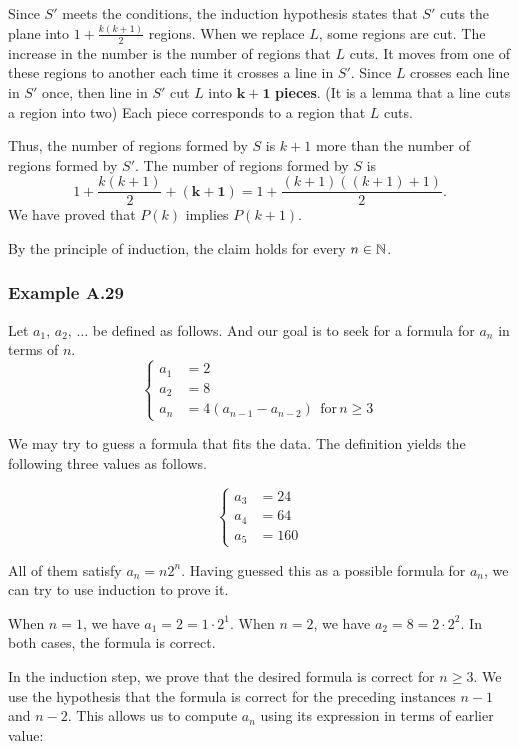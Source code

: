 \documentclass[../src/handouts/main.tex]{subfiles}
\begin{document}
Since $S'$ meets the conditions, the induction hypothesis states that $S'$ cuts the plane into $1 + \frac{k (k + 1)}{2}$ regions.
When we replace $L$, some regions are cut.
The increase in the number is the number of regions that $L$ cuts. It moves from one of these regions to another each time it crosses a line in $S'$.
Since $L$ crosses each line in $S'$ once, then line in $S'$ cut $L$ into $\bm{k + 1}$ \textbf{pieces}. (It is a lemma that a line cuts a region into two)
Each piece corresponds to a region that $L$ cuts.

Thus, the number of regions formed by $S$ is $k + 1$ more than the number of regions formed by $S'$.
The number of regions formed by $S$ is
$$
  1 + \frac{k (k + 1)}{2} + \bm{(k + 1)} = 1 + \frac{(k + 1)((k + 1) + 1)}{2}.
$$
We have proved that $P(k)$ implies $P(k + 1)$.

By the principle of induction, the claim holds for every $n \in \mathbb{N}$.

\subsubsection{Example A.29}

Let $a_1,\, a_2,\, \ldots$ be defined as follows. And our goal is to seek for a formula for $a_n$ in terms of $n$.
$$
  \begin{cases}
    a_1 & = 2                                                   \\
    a_2 & = 8                                                   \\
    a_n & = 4 (a_{n - 1} - a_{n - 2}) \ \ \text{for}\, n \geq 3
  \end{cases}
$$

We may try to guess a formula that fits the data.
The definition yields the following three values as follows.

$$
  \begin{cases}
    a_3 & = 24  \\
    a_4 & = 64  \\
    a_5 & = 160
  \end{cases}
$$

All of them satisfy $a_n = n 2^n$.
Having guessed this as a possible formula for $a_n$, we can try to use induction to prove it.

When $n = 1$, we have $a_1 = 2 = 1 \cdot 2^1$.
When $n = 2$, we have $a_2 = 8 = 2 \cdot 2^2$.
In both cases, the formula is correct.

In the induction step, we prove that the desired formula is correct for $n \geq 3$.
We use the hypothesis that the formula is correct for the preceding instances $n - 1$ and $n - 2$.
This allows us to compute $a_n$ using its expression in terms of earlier value:
\end{document}
